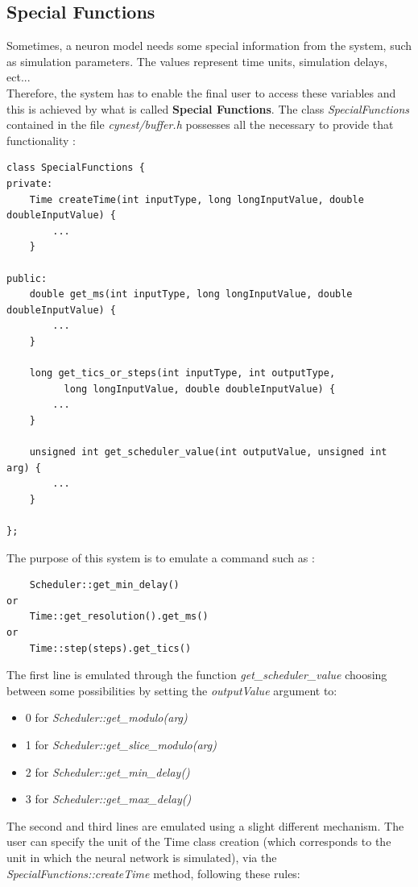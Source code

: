 \documentclass{article}
\begin{document}
\subsection{Special Functions}
Sometimes, a neuron model needs some special information from the system, such as simulation parameters. The values represent time units, simulation delays, ect...\\
Therefore, the system has to enable the final user to access these variables and this is achieved by what is called \textbf{Special Functions}. The class \emph{SpecialFunctions} contained in the file \emph{cynest/buffer.h} possesses all the necessary to provide that functionality :
\begin{verbatim}
class SpecialFunctions {
private:
    Time createTime(int inputType, long longInputValue, double doubleInputValue) {
        ...
    }

public:
    double get_ms(int inputType, long longInputValue, double doubleInputValue) {
        ...
    }

    long get_tics_or_steps(int inputType, int outputType, 
          long longInputValue, double doubleInputValue) {
        ...
    }

    unsigned int get_scheduler_value(int outputValue, unsigned int arg) {
        ...
    }

};
\end{verbatim}
The purpose of this system is to emulate a command such as :
\begin{verbatim}
    Scheduler::get_min_delay()
or
    Time::get_resolution().get_ms()
or
    Time::step(steps).get_tics()
\end{verbatim}
The first line is emulated through the function \emph{get\_scheduler\_value} choosing between some possibilities by setting the \emph{outputValue} argument to:
\begin{itemize}
\item 0 for \emph{Scheduler::get\_modulo(arg)}
\item 1 for \emph{Scheduler::get\_slice\_modulo(arg)}
\item 2 for \emph{Scheduler::get\_min\_delay()}
\item 3 for \emph{Scheduler::get\_max\_delay()}
\end{itemize}
The second and third lines are emulated using a slight different mechanism. The user can specify the unit of the Time class creation (which corresponds to the unit in which the neural network is simulated), via the \emph{SpecialFunctions::createTime} method, following these rules:
\end{document}
